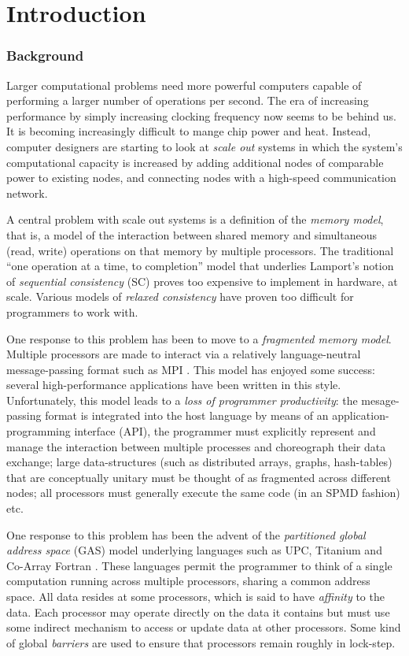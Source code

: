 \chapter{Introduction}
\subsection*{Background}
Larger computational problems need more powerful computers capable of
performing a larger number of operations per second. The era of
increasing performance by simply increasing clocking frequency now
seems to be behind us. It is becoming increasingly difficult
to mange chip power and heat.  Instead, computer
designers are starting to look at {\em scale out} systems in which the
system's computational capacity is increased by adding additional
nodes of comparable power to existing nodes, and connecting nodes with
a high-speed communication network.

A central problem with scale out systems is a definition of the {\em
memory model}, that is, a model of the interaction between shared
memory and  simultaneous (read, write) operations on that
memory by multiple processors. The traditional ``one operation at a
time, to completion'' model that underlies Lamport's notion of {\em
sequential consistency} (SC) proves too expensive to implement in
hardware, at scale. Various models of {\em relaxed consistency} have
proven too difficult for programmers to work with.  

One response to this problem has been to move to a {\em fragmented
memory model}. Multiple processors are made to interact via a
relatively language-neutral message-passing format such as MPI
\cite{mpi}. This model has enjoyed some success: several
high-performance applications have been written in this
style. Unfortunately, this model leads to a {\em loss of programmer
productivity}: the mesage-passing format is integrated into the host
language by means of an application-programming interface (API), the
programmer must explicitly represent and manage the interaction
between multiple processes and choreograph their data exchange; large
data-structures (such as distributed arrays, graphs, hash-tables) that
are conceptually unitary must be thought of as fragmented across
different nodes; all processors must generally execute the same code
(in an SPMD fashion) etc.

One response to this problem has been the advent of the {\em
partitioned global address space} (GAS) model underlying languages
such as UPC, Titanium and Co-Array Fortran \cite{pgas,titanium}. These
languages permit the programmer to think of a single computation
running across multiple processors, sharing a common address
space. All data resides at some processors, which is said to have {\em
affinity} to the data.  Each processor may operate directly on the
data it contains but must use some indirect mechanism to access or
update data at other processors. Some kind of global {\em barriers}
are used to ensure that processors remain roughly in lock-step.

